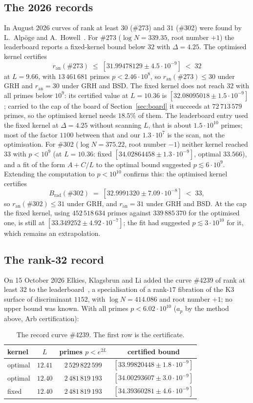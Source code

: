 \documentclass[11pt]{amsart}
\theoremstyle{remark}
\theoremstyle{definition}
\newcommand{\ran}{r_{\mathrm{an}}}
\begin{document}
\subsection*{The 2026 records}
In August 2026 curves of rank at least $30$ (\#273) and $31$ (\#302) were found by L.~Alp\"oge and A.~Howell~\cite{ICARM}. For \#273 ($\log N=339.35$, root number $+1$) the leaderboard reports a fixed-kernel bound below $32$ with $\Delta=4.25$. The optimised kernel certifies
\[
\ran(\#273)\;\le\;[31.99478129\pm4.5\cdot10^{-9}]\;<\;32
\]
at $L=9.66$, with $13\,461\,681$ primes $p<2.46\cdot10^8$, so $\ran(\#273)\le30$ under GRH and
$\ran=30$ under GRH and BSD. The fixed kernel does not reach $32$ with all primes below $10^9$: its
certified value at $L=10.36$ is $[32.08095018\pm1.5\cdot10^{-9}]$; carried to the cap of the board of
Section~\ref{sec:board} it succeeds at $72\,713\,579$ primes, so the optimised kernel needs $18.5\%$ of
them. The leaderboard entry used the fixed kernel at $\Delta=4.25$ without scanning $L$, that is about
$1.5\cdot10^{10}$ primes; most of the factor $1100$ between that and our $1.3\cdot10^7$ is the scan, not
the optimisation. For \#302 ($\log N=375.22$, root number $-1$) neither kernel reached $33$ with $p<10^9$ (at $L=10.36$:
fixed $[34.02864458\pm1.3\cdot10^{-9}]$, optimal $33.566$), and a fit of the form $A+C/L$ to the optimal
bound suggested $p\lesssim6\cdot10^9$. Extending the computation to $p<10^{10}$ confirms this: the
optimised kernel certifies
\[
 B_{\mathrm{rad}}(\#302)\;=\;[32.9991320\pm7.09\cdot10^{-8}]\;<\;33 ,
\]
so $\ran(\#302)\le31$ under GRH, and $\ran=31$ under GRH and BSD. At the cap the fixed kernel, using $452\,518\,634$ primes against $339\,885\,370$
for the optimised one, is still at $[33.349252\pm4.92\cdot10^{-7}]$; the fit had suggested $p\lesssim3\cdot10^{10}$ for it, which
remains an extrapolation.

\subsection*{The rank-32 record}\label{sec:4239}
On 15 October 2026 Elkies, Klagsbrun and Li added the curve \#4239 of rank at least $32$ to the leaderboard~\cite{ICARM}, a specialisation of a rank-$17$ fibration of the K3 surface of discriminant $1152$, with $\log N=414.086$ and root number $+1$; no upper bound was known. With all primes $p<6.02\cdot10^{10}$ ($a_p$ by the method above, Arb certification):

\begin{table}[h]
\centering\small
\begin{tabular}{lccc}
\toprule
kernel & $L$ & primes $p<e^{2L}$ & certified bound\\
\midrule
optimal & $12.41$ & $2\,529\,822\,599$ & $[33.99820448\pm1.8\cdot10^{-9}]$\\
optimal & $12.40$ & $2\,481\,819\,193$ & $[34.00293607\pm3.0\cdot10^{-9}]$\\
fixed   & $12.40$ & $2\,481\,819\,193$ & $[34.39360281\pm4.6\cdot10^{-9}]$\\
\bottomrule
\end{tabular}
\caption{The record curve \#4239. The first row is the certificate.}
\label{tab:4239}
\end{table}
\end{document}
